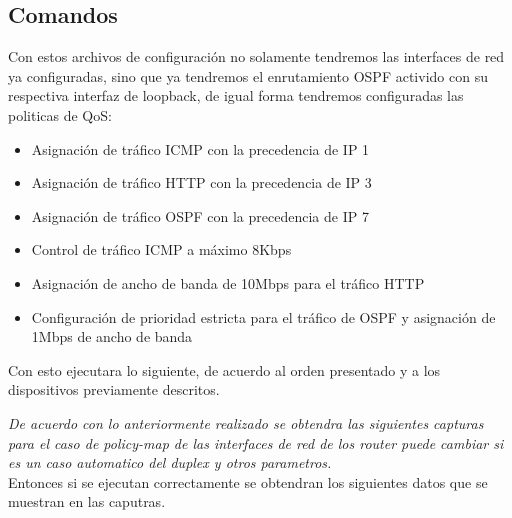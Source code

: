 \documentclass[10pt]{article}
\begin{document}
\subsection{Comandos}
Con estos archivos de configuración no solamente tendremos las interfaces de red ya configuradas, sino que ya tendremos el enrutamiento OSPF activido con su respectiva interfaz de loopback, de igual forma tendremos configuradas las politicas de QoS:
\begin{itemize}
  \item Asignación de tráfico ICMP con la precedencia de IP 1
  \item Asignación de tráfico HTTP con la precedencia de IP 3
  \item Asignación de tráfico OSPF con la precedencia de IP 7
  \item Control de tráfico ICMP a máximo 8Kbps
  \item Asignación de ancho de banda de 10Mbps para el tráfico HTTP
  \item Configuración de prioridad estricta para el tráfico de OSPF y asignación de 1Mbps de ancho de banda
\end{itemize}
Con esto ejecutara lo siguiente, de acuerdo al orden presentado y a los dispositivos previamente descritos.

\textit{De acuerdo con lo anteriormente realizado se obtendra las siguientes capturas para el caso de policy-map de las interfaces de red de los router puede cambiar si es un caso automatico del duplex y otros parametros.}\\
Entonces si se ejecutan correctamente se obtendran los siguientes datos que se muestran en las caputras.
\end{document}
